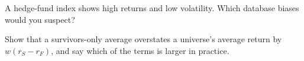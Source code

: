 \begin{interviewq}\label{iq:rs:point-in-time-data-and-the-biases:5}
A hedge-fund index shows high returns and low volatility. Which database biases would you suspect?
\end{interviewq}

\begin{interviewq}\label{iq:rs:point-in-time-data-and-the-biases:6}
Show that a survivors-only average overstates a universe's average return by $w(r_S - r_F)$, and say which of the terms is larger
in practice.
\end{interviewq}
